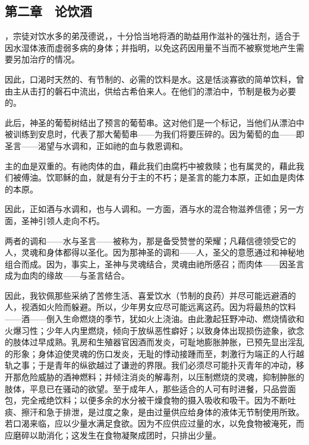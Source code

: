\subsection{第二章　论饮酒}

，宗徒对饮水多的弟茂德说，，十分恰当地将酒的助益用作滋补的强壮剂，适合于因水湿体液而虚弱多病的身体；并指明，以免这药因用量不当而不被察觉地产生需要另加治疗的情况。\par

因此，口渴时天然的、有节制的、必需的饮料是水。这是恬淡寡欲的简单饮料，曾由主从击打的磐石中流出，供给古希伯来人。在他们的漂泊中，节制是极为必要的。\par

此后，神圣的葡萄树结出了预言的葡萄串。这对他们是一个标记，当他们从漂泊中被训练到安息时，代表了那大葡萄串——为我们将要压碎的。因为葡萄的血——即圣言——渴望与水调和，正如祂的血与救恩调和。\par

主的血是双重的。有祂肉体的血，藉此我们由腐朽中被救赎；也有属灵的，藉此我们被傅油。饮耶稣的血，就是有分于主的不朽；是圣言的能力本原，正如血是肉体的本原。\par

因此，正如酒与水调和，也与人调和。一方面，酒与水的混合物滋养信德；另一方面，圣神引领人走向不朽。\par

两者的调和——水与圣言——被称为，那是备受赞誉的荣耀；凡藉信德领受它的人，灵魂和身体都得以圣化。因为那神圣的调和——人，圣父的意愿通过和神秘地组合而成。因为，事实上，圣神与灵魂结合，灵魂由祂所感召；而肉体——因圣言成为血肉的缘故——与圣言结合。\par

因此，我钦佩那些采纳了苦修生活、喜爱饮水（节制的良药）并尽可能远避酒的人，视酒如火险而躲避。所以，少年男女应尽可能远离这药。因为将最热的饮料——酒——倒入生命燃烧的季节，犹如火上浇油。由此激起狂野冲动、燃烧情欲和火爆习性；少年人内里燃烧，倾向于放纵恶性癖好；以致身体出现损伤迹象，欲念的肢体过早成熟。乳房和生殖器官因酒而发炎，可耻地膨胀肿胀，已预先显出淫乱的形象；身体迫使灵魂的伤口发炎，无耻的悸动接踵而至，刺激行为端正的人行越轨之事；于是青年的纵欲越过了谦逊的界限。我们必须尽可能扑灭青年的冲动，移开那危险威胁的酒神燃料；并倾注消炎的解毒剂，以压制燃烧的灵魂，抑制肿胀的肢体，平息已在骚动的欲望。至于成年人，那些适合的人可有时进餐，只品尝面包，完全戒绝饮料；以便多余的水分被干燥食物的摄入吸收和吸干。因为不断吐痰、擦汗和急于排泄，是过度之象，是由过量供应给身体的液体无节制使用所致。若口渴来临，应以少量水满足食欲。因为不应供应过量的水，以免食物被淹死，而应磨碎以助消化；这发生在食物凝聚成团时，只排出少量。\par

